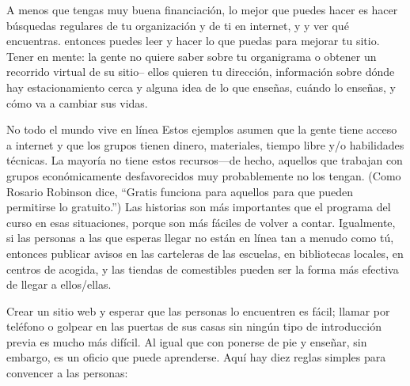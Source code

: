 A menos que tengas muy buena financiación,
lo mejor que puedes hacer es hacer búsquedas regulares de tu organización y de ti en internet, y
y ver qué encuentras.
entonces puedes leer 
y hacer lo que puedas para mejorar tu sitio.
Tener en mente:
la gente no quiere saber sobre tu organigrama o obtener un recorrido virtual de su sitio-- ellos quieren tu dirección,
información sobre dónde hay estacionamiento cerca 
y alguna idea de lo que enseñas,
cuándo lo enseñas,
y cómo va a cambiar sus vidas.


\begin{aside}{No todo el mundo vive en línea}
Estos ejemplos asumen que la gente tiene acceso a internet y que los grupos tienen dinero, materiales, tiempo libre y/o  habilidades técnicas.
La mayoría no tiene estos recursos---de hecho,
aquellos que trabajan con grupos económicamente desfavorecidos muy probablemente no los tengan.
 (Como Rosario Robinson dice, ``Gratis funciona para aquellos para que pueden permitirse lo gratuito.'')
Las historias son más importantes que el programa del curso en esas situaciones,
porque son más fáciles de volver a contar.
Igualmente,
si las personas a las que esperas llegar no están en línea tan a menudo como tú,
 entonces publicar avisos en las carteleras de las escuelas,
en bibliotecas locales,
 en centros de acogida,
y las tiendas de comestibles pueden ser la forma más efectiva de llegar a ellos/ellas.
\end{aside}



Crear un sitio web y esperar que las personas lo encuentren es fácil;
llamar por teléfono o golpear en las puertas de sus casas sin ningún tipo de introducción previa es mucho más difícil.
Al igual que con ponerse de pie y enseñar,
sin embargo, es un oficio que puede aprenderse.
 Aquí hay diez reglas simples para convencer a las personas:

